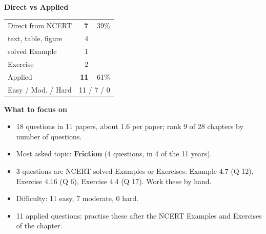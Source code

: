 \begin{minipage}[t]{0.34\linewidth}{\small\textbf{\color{crimson}Direct vs Applied}\par\smallskip
\begin{tabular}{@{}lrr@{}}\toprule
Direct from NCERT & \textbf{7} & 39\%\\
\quad text, table, figure & 4 &\\
\quad solved Example & 1 &\\
\quad Exercise & 2 &\\
Applied & \textbf{11} & 61\%\\\midrule
Easy / Mod. / Hard & \multicolumn{2}{r}{11 / 7 / 0}\\\bottomrule
\end{tabular}}\end{minipage}\hfill
\begin{minipage}[t]{0.63\linewidth}{\small\textbf{\color{crimson}What to focus on}\par\smallskip
\begin{itemize}[leftmargin=1.1em,itemsep=1pt,topsep=0pt]
\item 18 questions in 11 papers, about 1.6 per paper; rank 9 of 28 chapters by number of questions.
\item Most asked topic: \textbf{Friction} (4 questions, in 4 of the 11 years).
\item 3 questions are NCERT solved Examples or Exercises: Example 4.7 (Q 12), Exercise 4.16 (Q 6), Exercise 4.4 (Q 17). Work these by hand.
\item Difficulty: 11 easy, 7 moderate, 0 hard.
\item 11 applied questions: practise these after the NCERT Examples and Exercises of the chapter.
\end{itemize}}\end{minipage}\par
{}
